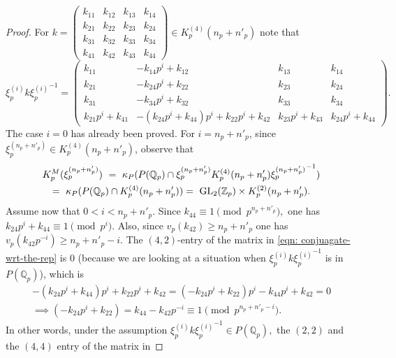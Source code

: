 \documentclass[11pt]{amsart}
\newcommand{\mirp}[1]{K_p^{(4)}(#1)}
\newcommand{\congp}[1]{K_p^{(2)}(#1)}
\begin{document}
\begin{proof} 
For $k = \left(\begin{smallmatrix}
	k_{11} & k_{12} & k_{13} & k_{14} \\
	k_{21} & k_{22} & k_{23} & k_{24} \\
	k_{31} & k_{32} & k_{33} & k_{34} \\
	k_{41} & k_{42} & k_{43} & k_{44}
\end{smallmatrix}\right) \in \mirp{n_p + n'_p}$ note that 
\begin{equation} 
\xi_p^{(i)} k {\xi_p^{(i)}}^{-1}  = \left(\begin{smallmatrix}
		k_{11} & -k_{14} p^{i} + k_{12} & k_{13} & k_{14} \\
		k_{21} & -k_{24} p^{i} + k_{22} & k_{23} & k_{24} \\
		k_{31} & -k_{34} p^{i} + k_{32} & k_{33} & k_{34} \\
		k_{21} p^{i} + k_{41} & -{\left(k_{24} p^{i} + k_{44}\right)} p^{i} + k_{22} p^{i} + k_{42} & k_{23} p^{i} + k_{43} & k_{24} p^{i} + k_{44}
	\end{smallmatrix}\right). \label{eqn: conjuagate-wrt-the-rep}
\end{equation}
The case $i = 0$ has already been proved. For $i=n_p + n'_p$, since $\xi_p^{(n_p + n'_p)} \in \mirp{n_p + n'_p}$, observe that
\begin{multline*}
K_p^M(\xi_p^{(n_p + n'_p)}) \ = \ \kappa_P( P(\mathbb{Q}_p) \cap \xi_p^{(n_p + n'_p)} \mirp{n_p + n'_p} {\xi_p^{(n_p + n'_p)}}^{-1}) \\
= \ \kappa_P( P(\mathbb{Q}_p) \cap  \mirp{n_p + n'_p} ) 
= \ {\rm GL}_2(\mathbb{Z}_p) \times \congp{n_p + n'_p}.
\end{multline*}
Assume now that $0< i < n_p + n'_p.$ Since $k_{44} \equiv 1 \pmod{p^{n_p + n'_p}},$ one has 
$k_{24}p^{i} + k_{44} \equiv 1 \pmod{p^{i}}.$ 
Also, since $v_p(k_{42}) \geq n_p + n'_p$ one has $v_p(k_{42}p^{-i}) \geq n_p + n'_p-i.$
The $(4,2)$-entry of the matrix in \eqref{eqn: conjuagate-wrt-the-rep} is $0$ (because we are looking at a situation when 
$\xi_p^{(i)} k {\xi_p^{(i)}}^{-1}$ is in $P(\mathbb{Q}_p)$), which is
\begin{multline*} 
-(k_{24}p^{i} + k_{44})p^{i} + k_{22}p^{i} + k_{42} = (-k_{24}p^{i} +k_{22})p^{i} -k_{44}p^{i} + k_{42} = 0 \\ \implies  
(-k_{24}p^{i} +k_{22}) = k_{44} - k_{42}p^{-i} \equiv 1 \pmod{p^{n_p +n'_p-i}}.
\end{multline*}
In other words, under the assumption $\xi_p^{(i)} k {\xi_p^{(i)}}^{-1} \in P(\mathbb{Q}_p),$ the $(2,2)$ and the $(4,4)$ entry of the matrix in 

\end{proof}
\end{document}
